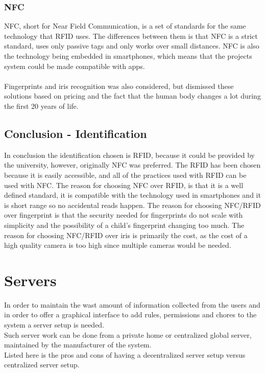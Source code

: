 \subsubsection{NFC}
NFC, short for Near Field Communication, is a set of standards for the same technology that RFID uses. The differences between them is that NFC is a strict standard, uses only passive tags and only works over small distances.\citep{rfidAndNfc} NFC is also the technology being embedded in smartphones, which means that the projects system could be made compatible with apps.\\
\\
Fingerprints and iris recognition was also considered, but dismissed these solutions based on pricing and the fact that the human body changes a lot during the first 20 years of life.\citep{irisid}

\subsection{Conclusion - Identification}
In conclusion the identification chosen is RFID, because it could be provided by the university, however, originally NFC was preferred. 
The RFID has been chosen because it is easily accessible, and all of the practices used with RFID can be used with NFC. The reason for choosing NFC over RFID, is that it is a well defined standard, it is compatible with the technology used in smartphones and it is short range so no accidental reads happen. The reason for choosing NFC/RFID over fingerprint is that the security needed for fingerprints do not scale with simplicity and the possibility of a child's fingerprint changing too much. The reason for choosing NFC/RFID over iris is primarily the cost, as the cost of a high quality camera is too high since multiple cameras would be needed.

\section{Servers}
In order to maintain the wast amount of information collected from the users and in order to offer a graphical interface to add rules, permissions and chores to the system a server setup is needed.\\
Such server work can be done from a private home or centralized global server, maintained by the manufacturer of the system.\\

Listed here is the pros and cons of having a decentralized server setup versus centralized server setup.\\

